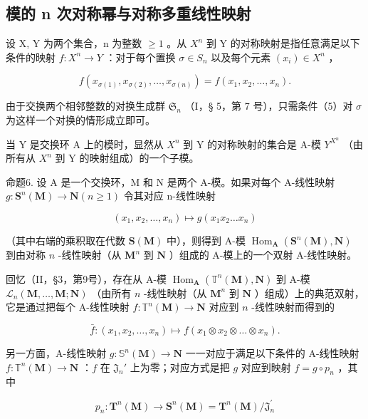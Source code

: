 \subsection{模的 n 次对称幂与对称多重线性映射}

设 X, Y 为两个集合，n 为整数 \(\geqslant1\) 。从 \(X^{n}\) 到 Y 的对称映射是指任意满足以下条件的映射 \(f: X^{n} \to Y\) ：对于每个置换 \(\sigma \in S_{n}\) 以及每个元素 \((x_{i}) \in X^{n}\) ，

\[
f (x _ {\sigma (1)}, x _ {\sigma (2)}, \dots , x _ {\sigma (n)}) = f (x _ {1}, x _ {2}, \dots , x _ {n}).\tag{5}
\]

由于交换两个相邻整数的对换生成群 \(\mathfrak{S}_n\) （I，§ 5，第 7 号），只需条件（5）对 \(\sigma\) 为这样一个对换的情形成立即可。

当 Y 是交换环 A 上的模时，显然从 \(X^{n}\) 到 Y 的对称映射的集合是 A-模 \(Y^{X^{n}}\) （由所有从 \(X^{n}\) 到 Y 的映射组成）的一个子模。

命题6. 设 A 是一个交换环，M 和 N 是两个 A-模。如果对每个 A-线性映射 \(g: \mathbf{S}^n(\mathbf{M}) \to \mathbf{N} (n \geqslant 1)\) 令其对应 n-线性映射

\[
\left(x _ {1}, x _ {2}, \dots , x _ {n}\right) \mapsto g \left(x _ {1} x _ {2} \dots x _ {n}\right)\tag{6}
\]

（其中右端的乘积取在代数 \(\mathbf{S}(\mathbf{M})\) 中），则得到 A-模 \(\operatorname{Hom}_{\mathbf{A}}(\mathbf{S}^{n}(\mathbf{M}), \mathbf{N})\) 到由对称 \(n\) -线性映射（从 \(\mathbf{M}^{n}\) 到 \(\mathbf{N}\) ）组成的 A-模上的一个双射 A-线性映射。

回忆（II，§3，第9号），存在从 A-模 \(\operatorname{Hom}_{\mathbf{A}}(\mathbb{T}^{n}(\mathbf{M}), \mathbf{N})\) 到 A-模 \(\mathcal{L}_{n}(\mathbf{M}, \ldots, \mathbf{M}; \mathbf{N})\) （由所有 \(n\) -线性映射（从 \(\mathbf{M}^{n}\) 到 \(\mathbf{N}\) ）组成）上的典范双射，它是通过把每个 A-线性映射 \(f: \mathbb{T}^{n}(\mathbf{M}) \to \mathbf{N}\) 对应到 \(n\) -线性映射而得到的

\[
\bar {f} \colon (x _ {1}, x _ {2}, \dots , x _ {n}) \mapsto f (x _ {1} \otimes x _ {2} \otimes \dots \otimes x _ {n}).\tag{7}
\]

另一方面，A-线性映射 \(g \colon \mathbb{S}^n(\mathbf{M}) \to \mathbf{N}\) 一一对应于满足以下条件的 A-线性映射 \(f \colon \mathbb{T}^n(\mathbf{M}) \to \mathbf{N}\) ：\(f\) 在 \(\mathfrak{J}_n'\) 上为零；对应方式是把 \(g\) 对应到映射 \(f = g \circ p_n\) ，其中

\[
p _ {n} \colon \mathbf {T} ^ {n} (\mathbf {M}) \rightarrow \mathbf {S} ^ {n} (\mathbf {M}) = \mathbf {T} ^ {n} (\mathbf {M}) / \mathfrak {J} _ {n} ^ {\prime}
\]

